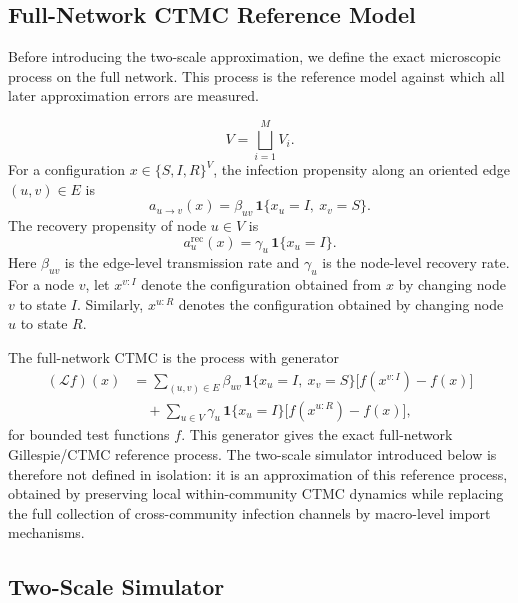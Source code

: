 \documentclass[12pt,a4paper]{article}
\begin{document}
\subsection{Full-Network CTMC Reference Model}
\label{sec:full_network_ctmc_reference}

Before introducing the two-scale approximation, we define the exact microscopic process on the full network. This process is the reference model against which all later approximation errors are measured.

\[
V=\bigsqcup_{i=1}^{M} V_i .
\]
For a configuration \(x\in\{S,I,R\}^{V}\), the infection propensity along an oriented edge \((u,v)\in E\) is
\[
a_{u\to v}(x)
=\beta_{uv}\,\mathbf{1}\{x_u=I,\ x_v=S\}.
\]
The recovery propensity of node \(u\in V\) is
\[
a_u^{\mathrm{rec}}(x)
=\gamma_u\,\mathbf{1}\{x_u=I\}.
\]
Here \(\beta_{uv}\) is the edge-level transmission rate and \(\gamma_u\) is the node-level recovery rate. For a node \(v\), let \(x^{v:I}\) denote the configuration obtained from \(x\) by changing node \(v\) to state \(I\). Similarly, \(x^{u:R}\) denotes the configuration obtained by changing node \(u\) to state \(R\).

The full-network CTMC is the process with generator
\[
\begin{aligned}
(\mathcal L f)(x)
&=
\sum_{(u,v)\in E}
\beta_{uv}\,\mathbf{1}\{x_u=I,\ x_v=S\}
\bigl[f(x^{v:I})-f(x)\bigr]
\\
&\quad+
\sum_{u\in V}
\gamma_u\,\mathbf{1}\{x_u=I\}
\bigl[f(x^{u:R})-f(x)\bigr],
\end{aligned}
\]
for bounded test functions \(f\). This generator gives the exact full-network Gillespie/CTMC reference process. The two-scale simulator introduced below is therefore not defined in isolation: it is an approximation of this reference process, obtained by preserving local within-community CTMC dynamics while replacing the full collection of cross-community infection channels by macro-level import mechanisms.

\subsection{Two-Scale Simulator}
\label{sec:two_scale_simulator}
\end{document}
